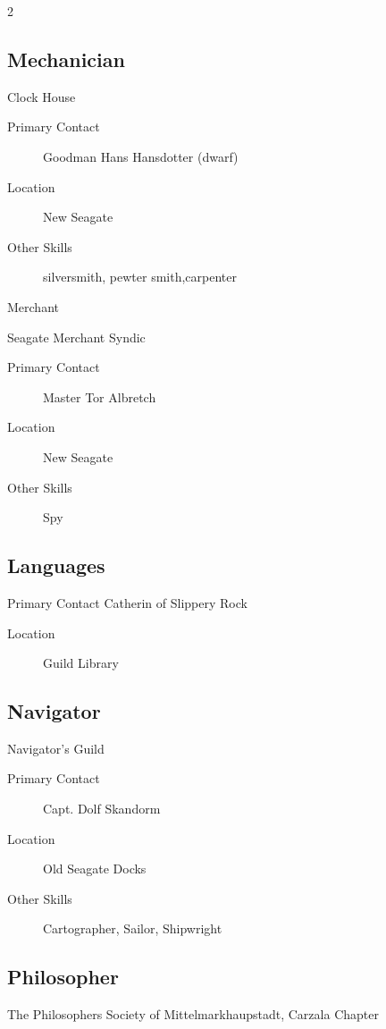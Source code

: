 \begin{multicols}{2}
\subsection{Mechanician}

Clock House
\begin{description}

\item[Primary Contact] Goodman Hans Hansdotter (dwarf)
\item[Location] New Seagate
\item[Other Skills] silversmith, pewter smith,carpenter
\end{description}

Merchant

Seagate Merchant Syndic
\begin{description}
\item[Primary Contact] Master Tor Albretch
\item[Location] New Seagate
\item[Other Skills] Spy
\end{description}

\subsection{Languages}

Primary Contact Catherin of Slippery Rock

\begin{description}
\item[Location] Guild Library
\end{description}

\subsection{Navigator}

Navigator’s Guild

\begin{description}
\item[Primary Contact] Capt. Dolf Skandorm
\item[Location] Old Seagate Docks
\item[Other Skills] Cartographer, Sailor, Shipwright
\end{description}

\subsection{Philosopher}

The Philosophers Society of
Mittelmarkhaupstadt, Carzala Chapter


\end{multicols}
